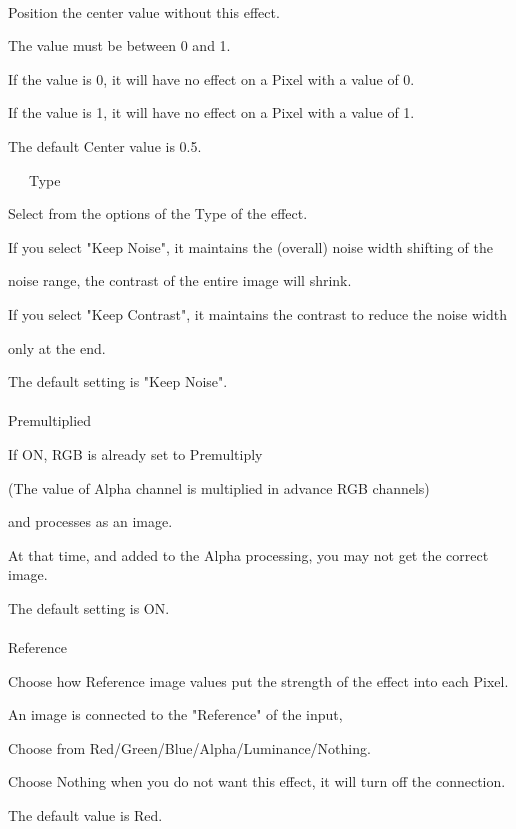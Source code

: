 \documentclass[a4paper,12pt]{article}
\begin{document}
\ \vspace{-0.2em}
\par
Position the center value without this effect.\par
The value must be between 0 and 1.\par
If the value is 0, it will have no effect on a Pixel with a value of 0.\par
If the value is 1, it will have no effect on a Pixel with a value of 1.\par
The default Center value is 0.5.\\
\par
\noindent \ \ \, Type\par
Select from the options of the Type of the effect.\par
If you select "Keep Noise", it maintains the (overall) noise width shifting of the\par
noise range, the contrast of the entire image will shrink.\par
If you select "Keep Contrast", it maintains the contrast to reduce the noise width\par
only at the end.\par
The default setting is "Keep Noise".\\
\\
Premultiplied\par
If ON, RGB is already set to Premultiply\par
(The value of Alpha channel is multiplied in advance RGB channels)\par
and processes as an image.\par
At that time, and added to the Alpha processing, you may not get the correct image.\par
The default setting is ON.\\
\\
Reference\par
Choose how Reference image values put the strength of the effect into each Pixel.\par
An image is connected to the "Reference" of the input,\par
Choose from Red/Green/Blue/Alpha/Luminance/Nothing.\par
Choose Nothing when you do not want this effect, it will turn off the connection.\par
The default value is Red.
\end{document}
